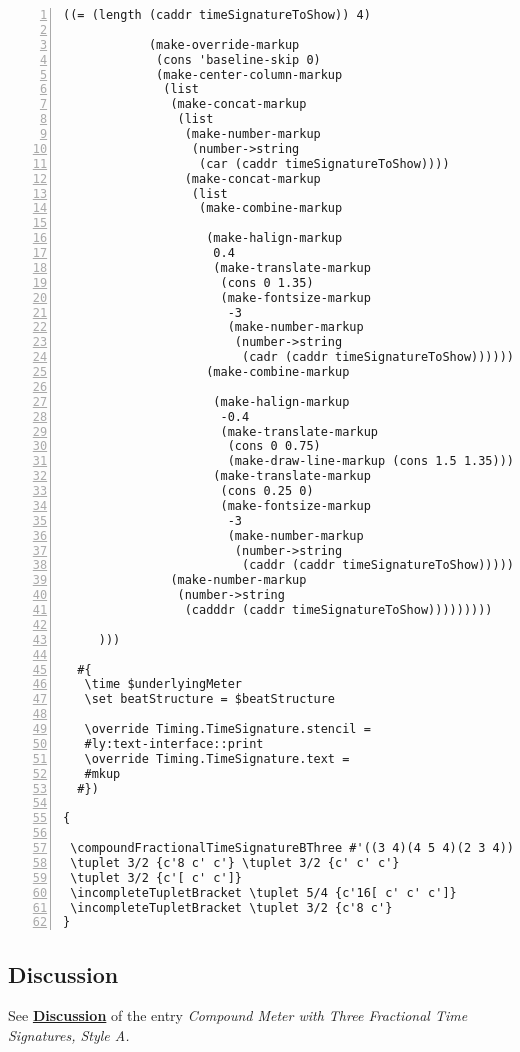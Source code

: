 \begin{Verbatim}[numbers=left,xleftmargin=5mm]
           ((= (length (caddr timeSignatureToShow)) 4)

            (make-override-markup
             (cons 'baseline-skip 0)
             (make-center-column-markup
              (list
               (make-concat-markup
                (list
                 (make-number-markup
                  (number->string
                   (car (caddr timeSignatureToShow))))
                 (make-concat-markup
                  (list
                   (make-combine-markup

                    (make-halign-markup
                     0.4
                     (make-translate-markup
                      (cons 0 1.35)
                      (make-fontsize-markup
                       -3
                       (make-number-markup
                        (number->string
                         (cadr (caddr timeSignatureToShow)))))))
                    (make-combine-markup

                     (make-halign-markup
                      -0.4
                      (make-translate-markup
                       (cons 0 0.75)
                       (make-draw-line-markup (cons 1.5 1.35))))
                     (make-translate-markup
                      (cons 0.25 0)
                      (make-fontsize-markup
                       -3
                       (make-number-markup
                        (number->string
                         (caddr (caddr timeSignatureToShow))))))))))))
               (make-number-markup
                (number->string
                 (cadddr (caddr timeSignatureToShow)))))))))

     )))

  #{
   \time $underlyingMeter
   \set beatStructure = $beatStructure

   \override Timing.TimeSignature.stencil =
   #ly:text-interface::print
   \override Timing.TimeSignature.text =
   #mkup
  #})

{

 \compoundFractionalTimeSignatureBThree #'((3 4)(4 5 4)(2 3 4)) 67/60 3,3,3,4,2
 \tuplet 3/2 {c'8 c' c'} \tuplet 3/2 {c' c' c'}
 \tuplet 3/2 {c'[ c' c']}
 \incompleteTupletBracket \tuplet 5/4 {c'16[ c' c' c']}
 \incompleteTupletBracket \tuplet 3/2 {c'8 c'}
}
\end{Verbatim}


\subsection{Discussion}
See \hyperref[sec:compoundfractionalmeter_discussion_two]{\textbf{Discussion}} of the entry \textit{Compound Meter with Three Fractional Time Signatures, Style A.}


